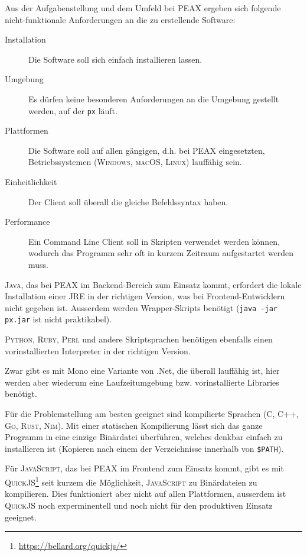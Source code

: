 Aus der Aufgabenstellung und dem Umfeld bei PEAX ergeben sich folgende nicht-funktionale Anforderungen an die zu erstellende Software:

\begin{description}
    \item[Installation] Die Software soll sich einfach installieren lassen.
    \item[Umgebung] Es dürfen keine besonderen Anforderungen an die Umgebung gestellt werden, auf der \texttt{px} läuft.
    \item[Plattformen] Die Software soll auf allen gängigen, d.h. bei PEAX eingesetzten, Betriebssystemen (\textsc{Windows}, \textsc{macOS}, \textsc{Linux}) lauffähig sein.
    \item[Einheitlichkeit] Der Client soll überall die gleiche Befehlssyntax haben.
    \item[Performance] Ein Command Line Client soll in Skripten verwendet werden können, wodurch das Programm sehr oft in kurzem Zeitraum aufgestartet werden muss.
\end{description}

\textsc{Java}, das bei PEAX im Backend-Bereich zum Einsatz kommt, erfordert die lokale Installation einer JRE in der richtigen Version, was bei Frontend-Entwicklern nicht gegeben ist. Ausserdem werden Wrapper-Skripts benötigt (\texttt{java -jar px.jar} ist nicht praktikabel).

\textsc{Python}, \textsc{Ruby}, \textsc{Perl} und andere Skriptsprachen benötigen ebenfalls einen vorinstallierten Interpreter in der richtigen Version.

Zwar gibt es mit Mono eine Variante von .Net, die überall lauffähig ist, hier werden aber wiederum eine Laufzeitumgebung bzw. vorinstallierte Libraries benötigt.

Für die Problemstellung am besten geeignet sind kompilierte Sprachen (C, C++, \textsc{Go}, \textsc{Rust}, \textsc{Nim}). Mit einer statischen Kompilierung lässt sich das ganze Programm in eine einzige Binärdatei überführen, welches denkbar einfach zu installieren ist (Kopieren nach einem der Verzeichnisse innerhalb von \texttt{\$PATH}).

Für \textsc{JavaScript}, das bei PEAX im Frontend zum Einsatz kommt, gibt es mit \textsc{QuickJS}\footnote{\url{https://bellard.org/quickjs/}} seit kurzem die Möglichkeit, \textsc{JavaScript} zu Binärdateien zu kompilieren. Dies funktioniert aber nicht auf allen Plattformen, ausserdem ist \textsc{QuickJS} noch experminentell und noch nicht für den produktiven Einsatz geeignet.

